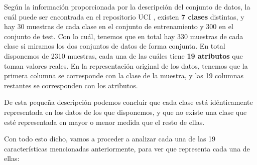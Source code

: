 \documentclass[11pt,a4paper]{article}
\begin{document}
Según la información proporcionada por la descripción del conjunto de datos, la cuál puede ser encontrada en el
repositorio UCI \cite{bib:uci-repo}, existen \textbf{7 clases} distintas, y hay 30 muestras de cada clase en el conjunto de
entrenamiento y 300 en el conjunto de test. Con lo cuál, tenemos que en total hay 330 muestras de cada clase si miramos
los dos conjuntos de datos de forma conjunta. En total disponemos de 2310 muestras, cada una de las cuáles tiene \textbf{19
atributos} que toman valores reales. En la representación original de los datos, tenemos que la primera columna se
corresponde con la clase de la muestra, y las 19 columnas restantes se corresponden con los atributos. 

De esta pequeña descripción podemos concluir que cada clase está idénticamente representada en los datos de los que
disponemos, y que no existe una clase que esté representada en mayor o menor medida que el resto de ellas. 

Con todo esto dicho, vamos a proceder a analizar cada una de las 19 características mencionadas anteriormente, para ver
que representa cada una de ellas:
\end{document}
